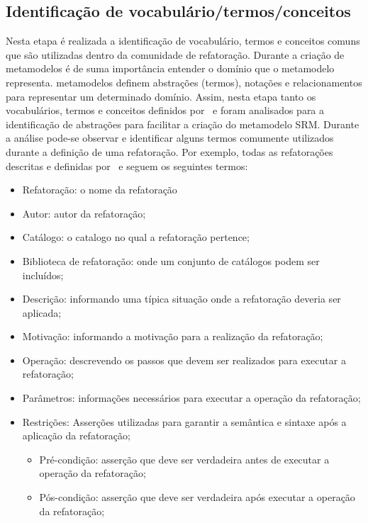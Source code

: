\subsection{Identificação de vocabulário/termos/conceitos}

Nesta etapa é realizada a identificação de vocabulário, termos e conceitos comuns que são utilizadas dentro da comunidade de refatoração. Durante a criação de metamodelos é de suma importância entender o domínio que o metamodelo representa. metamodelos definem abstrações (termos), notações e relacionamentos para representar um determinado domínio. Assim, nesta etapa tanto os vocabulários, termos e conceitos definidos por~ e  foram analisados para a identificação de abstrações para facilitar a criação do metamodelo SRM. Durante a análise pode-se observar e identificar alguns termos comumente utilizados durante a definição de uma refatoração. Por exemplo, todas as refatorações descritas e definidas por~ e  seguem os seguintes termos: 

\begin{itemize}
\item Refatoração: o nome da refatoração
\item Autor: autor da refatoração;
\item Catálogo: o catalogo no qual a refatoração pertence;
\item Biblioteca de refatoração: onde um conjunto de catálogos podem ser incluídos;
\item Descrição: informando uma típica situação onde a refatoração deveria ser aplicada;
\item Motivação: informando a motivação para a realização da refatoração;
\item Operação: descrevendo os passos que devem ser realizados para executar a refatoração;
\item Parâmetros: informações necessários para executar a operação da refatoração;
\item Restrições: Asserções utilizadas para garantir a semântica e sintaxe após a aplicação da refatoração;
\begin{itemize}
\item Pré-condição: asserção que deve ser verdadeira antes de executar a operação da refatoração;
\item Pós-condição: asserção que deve ser verdadeira após executar a operação da refatoração;
\end{itemize}
\end{itemize}

